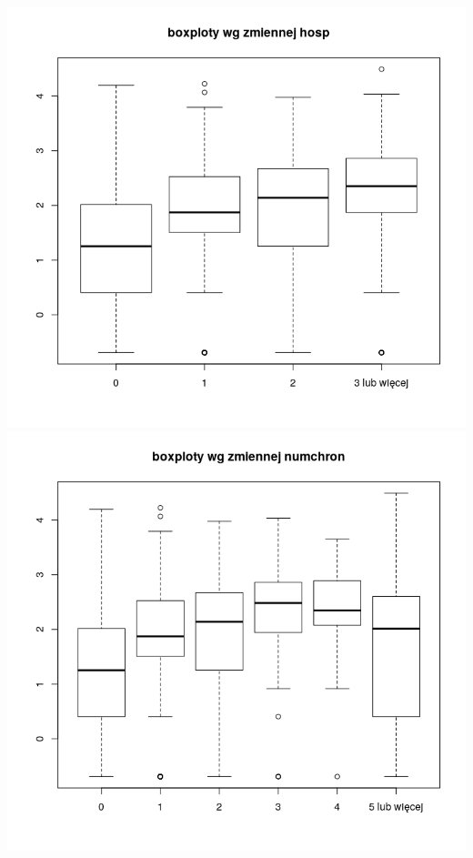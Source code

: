 \documentclass[a4paper,11pt]{article}
\begin{document}
\includegraphics[scale=.45]{Rplot2.png} 
\includegraphics[scale=.45]{Rplot3.png} 
\end{document}

